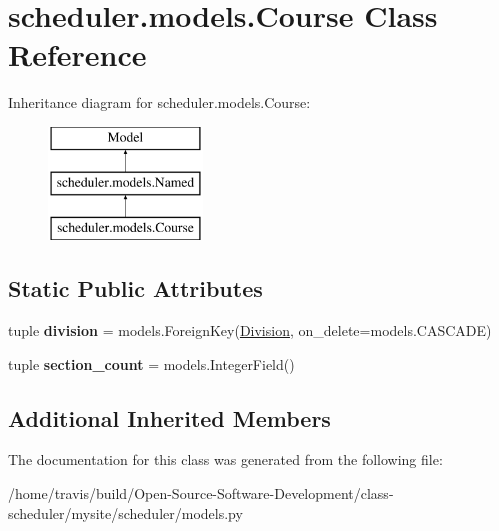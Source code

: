 \hypertarget{classscheduler_1_1models_1_1_course}{\section{scheduler.\-models.\-Course Class Reference}
\label{classscheduler_1_1models_1_1_course}
}
Inheritance diagram for scheduler.\-models.\-Course\-:\begin{figure}[H]
\begin{center}
\leavevmode
\includegraphics[height=3.000000cm]{classscheduler_1_1models_1_1_course}
\end{center}
\end{figure}
\subsection*{Static Public Attributes}
\begin{DoxyCompactItemize}
\item 
\hypertarget{classscheduler_1_1models_1_1_course_a469fbc25ba99da1185556bcd2d46f1b0}{tuple {\bfseries division} = models.\-Foreign\-Key(\hyperlink{classscheduler_1_1models_1_1_division}{Division}, on\-\_\-delete=models.\-C\-A\-S\-C\-A\-D\-E)}\label{classscheduler_1_1models_1_1_course_a469fbc25ba99da1185556bcd2d46f1b0}

\item 
\hypertarget{classscheduler_1_1models_1_1_course_a954dad31e8fd543a5158eb145e76837f}{tuple {\bfseries section\-\_\-count} = models.\-Integer\-Field()}\label{classscheduler_1_1models_1_1_course_a954dad31e8fd543a5158eb145e76837f}

\end{DoxyCompactItemize}
\subsection*{Additional Inherited Members}


The documentation for this class was generated from the following file\-:\begin{DoxyCompactItemize}
\item 
/home/travis/build/\-Open-\/\-Source-\/\-Software-\/\-Development/class-\/scheduler/mysite/scheduler/models.\-py\end{DoxyCompactItemize}
